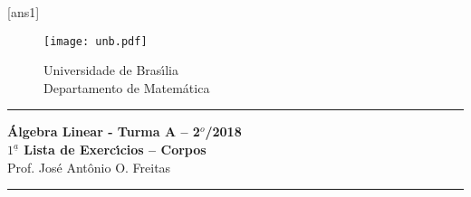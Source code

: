 \documentclass[12pt]{exam}
\newcommand{\vesp}[1]{\vspace{ #1  cm}}
\begin{document}
\pagestyle{empty}

[ans1]

\begin{figure}[h]
        \begin{minipage}[c]{1.7cm}
        \texttt{[image: unb.pdf]}
        \end{minipage}%
        \hspace{0pt}
        \begin{minipage}[c]{4in}
          {Universidade de Bras{\'\i}lia} \\
          {Departamento de Matem{\'a}tica}
\end{minipage}
\end{figure}

\vesp{-0.35} \hrule

\begin{center}
{\Large\bf \'Algebra Linear - Turma A -- 2$^{o}$/2018} \\ \vspace{9pt} {\large\bf
  $1^{\underline{a}}$ Lista de Exerc{\'\i}cios -- Corpos}\\ \vspace{9pt} Prof. Jos{\'e} Ant{\^o}nio O. Freitas
\end{center}
\hrule

\vesp{.6}
\end{document}
